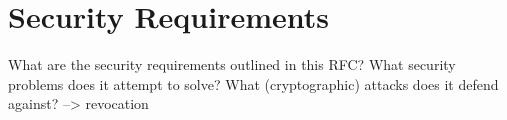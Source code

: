 \documentclass[10pt,conference,a4paper]{IEEEtran}
\begin{document}
\section{Security Requirements}
\label{security_requirements}
What are the security requirements outlined in this RFC? What security problems does it attempt to solve? What (cryptographic) attacks does it defend against?
--> revocation



\end{document}
